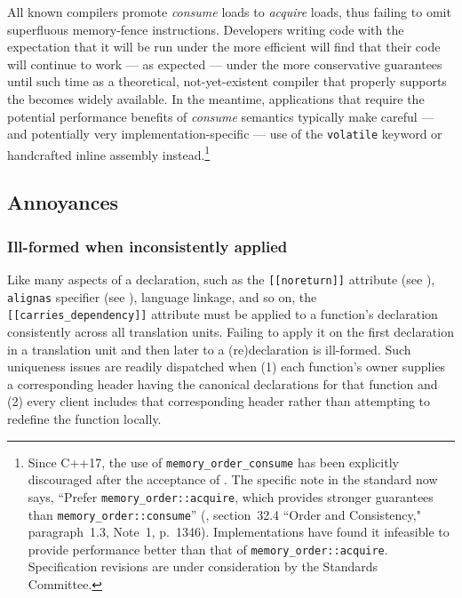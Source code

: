 All known compilers promote \emph{consume} loads to \emph{acquire}
loads, thus failing to omit superfluous memory-fence instructions.
Developers writing code with the expectation that it will be run under
the more efficient   will find that their code will continue to work --- as
expected --- under the more conservative 
guarantees until such time as a theoretical, not-yet-existent compiler
that properly supports the 
 becomes widely available. In the
meantime, applications that require the potential performance benefits
of \emph{consume} semantics typically make careful --- and potentially
very implementation-specific --- use of the \lstinline!volatile! keyword or
handcrafted inline assembly instead.{\cprotect\footnote{Since C++17, the
use of \lstinline!memory_order_consume! has been explicitly
  discouraged after the acceptance of \cite{boehm16}. The specific
  note in the standard now says, ``Prefer
  \lstinline!memory_order::acquire!, which provides stronger guarantees
  than \lstinline!memory_order::consume!'' (\cite{iso17}, section~32.4 ``Order and Consistency," paragraph~1.3, Note~1, p.~1346). Implementations have found it infeasible to provide performance better
  than that of \lstinline!memory_order::acquire!. Specification revisions
  are under consideration by the Standards Committee.}}

\subsection[Annoyances]{Annoyances}\label{annoyances}

\subsubsection[Ill-formed when inconsistently applied]{Ill-formed when inconsistently applied}\label{ill-formed-when-inconsistently-applied}

Like many aspects of a declaration, such as the
\lstinline![[noreturn]]! attribute (see\linebreak%
),
\lstinline!alignas! specifier (see ), language linkage, and so on,
the \lstinline![[carries_dependency]]! attribute must be applied to a
function's declaration consistently across all translation units.
Failing to apply it on the first declaration in a translation unit and
then later to a (re)declaration is ill-formed. Such uniqueness issues
are readily dispatched when (1) each function's owner supplies a
corresponding header having the canonical declarations for that function
and (2) every client includes that corresponding header rather than
attempting to redefine the function locally.

